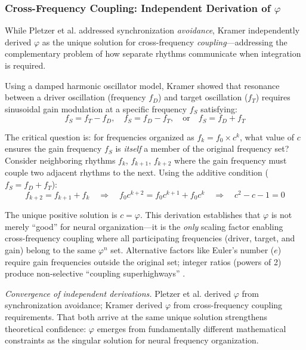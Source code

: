 \documentclass[11pt,a4paper]{article}
\newcommand{\phisym}{\varphi}
\begin{document}
\subsubsection{Cross-Frequency Coupling: Independent Derivation of $\phisym$}

While Pletzer et al. addressed synchronization \textit{avoidance}, Kramer \parencite{kramer2022golden} independently derived $\phisym$ as the unique solution for cross-frequency \textit{coupling}---addressing the complementary problem of how separate rhythms communicate when integration is required.

Using a damped harmonic oscillator model, Kramer showed that resonance between a driver oscillation (frequency $f_D$) and target oscillation ($f_T$) requires sinusoidal gain modulation at a specific frequency $f_S$ satisfying:
\begin{equation}
f_S = f_T - f_D, \quad f_S = f_D - f_T, \quad \text{or} \quad f_S = f_D + f_T
\label{eq:kramer_resonance}
\end{equation}

The critical question is: for frequencies organized as $f_k = f_0 \times c^k$, what value of $c$ ensures the gain frequency $f_S$ is \textit{itself} a member of the original frequency set? Consider neighboring rhythms $f_k$, $f_{k+1}$, $f_{k+2}$ where the gain frequency must couple two adjacent rhythms to the next. Using the additive condition ($f_S = f_D + f_T$):
\begin{equation}
f_{k+2} = f_{k+1} + f_k \quad \Rightarrow \quad f_0 c^{k+2} = f_0 c^{k+1} + f_0 c^k \quad \Rightarrow \quad c^2 - c - 1 = 0
\end{equation}

The unique positive solution is $c = \phisym$. This derivation establishes that $\phisym$ is not merely ``good'' for neural organization---it is the \textit{only} scaling factor enabling cross-frequency coupling where all participating frequencies (driver, target, and gain) belong to the same $\phisym^n$ set. Alternative factors like Euler's number ($e$) require gain frequencies outside the original set; integer ratios (powers of 2) produce non-selective ``coupling superhighways'' \parencite{hoppensteadt1997weakly}.

\textit{Convergence of independent derivations.} Pletzer et al. derived $\phisym$ from synchronization avoidance; Kramer derived $\phisym$ from cross-frequency coupling requirements. That both arrive at the same unique solution strengthens theoretical confidence: $\phisym$ emerges from fundamentally different mathematical constraints as the singular solution for neural frequency organization.
\end{document}
